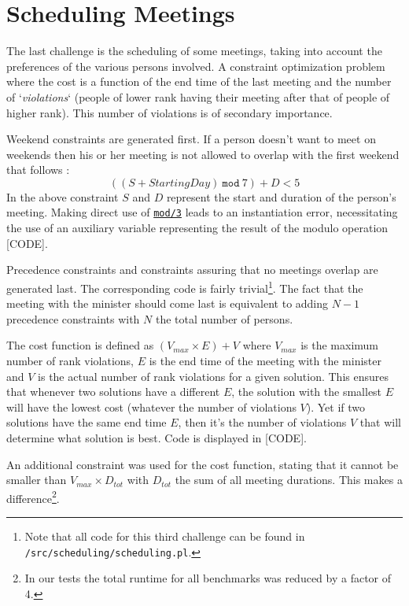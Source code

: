 \section{Scheduling Meetings}

The last challenge is the scheduling of some meetings, taking into account the preferences of the various persons involved. A constraint optimization problem where the cost is a function of the end time of the last meeting and the number of `\textit{violations}` (people of lower rank having their meeting after that of people of higher rank). This number of violations is of secondary importance.\\\par

Weekend constraints are generated first. If a person doesn't want to meet on weekends then his or her meeting is not allowed to overlap with the first weekend that follows :
$$((S + \textit{StartingDay})\ \texttt{mod}\ 7) + D <  5$$
In the above constraint $S$ and $D$ represent the start and duration of the person's meeting. Making direct use of \href{https://www.eclipseclp.org/doc/bips/kernel/arithmetic/mod-3.html}{\texttt{mod/3}} leads to an instantiation error, necessitating the use of an auxiliary variable representing the result of the modulo operation [CODE].\par
Precedence constraints and constraints assuring that no meetings overlap are generated last. The corresponding code is fairly trivial\footnote{Note that all code for this third challenge can be found in \texttt{/src/scheduling/scheduling.pl}.}. The fact that the meeting with the minister should come last is equivalent to adding $N-1$ precedence constraints with $N$ the total number of persons. \\\par

The cost function is defined as $(V_{max}\times E)+V$ where $V_{max}$ is the maximum number of rank violations, $E$ is the end time of the meeting with the minister and $V$ is the actual number of rank violations for a given solution. This ensures that whenever two solutions have a different $E$, the solution with the smallest $E$ will have the lowest cost (whatever the number of violations $V$). Yet if two solutions have the same end time $E$, then it's the number of violations $V$ that will determine what solution is best. Code is displayed in [CODE]. \par
An additional constraint was used for the cost function, stating that it cannot be smaller than $V_{max}\times D_{tot}$ with $D_{tot}$ the sum of all meeting durations. This makes a difference\footnote{In our tests the total runtime for all benchmarks was reduced by a factor of 4.}.\\\par

